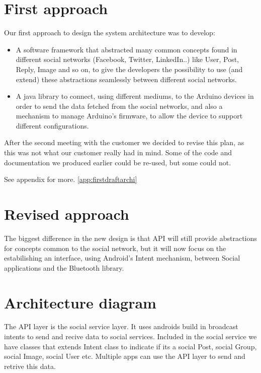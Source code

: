 \section{First approach}

Our first approach to design the system architecture was to develop:

\begin{itemize}
\item A software framework that
abstracted many common concepts found in different social networks (Facebook, Twitter, LinkedIn..)
like User, Post, Reply, Image and so on, to give the developers the possibility to use
(and extend) these abstractions seamlessly between different social networks.
\end{itemize}

\begin{itemize}
\item A java library to connect, using different mediums, to the Arduino devices in order
to send the data fetched from the social networks, and also a mechanism to manage Arduino's firmware,
to allow the device to support different configurations.
\end{itemize}

After the second meeting with the customer we decided to revise this plan, as this was not what
our customer really had in mind. Some of the code and documentation we produced earlier could be re-used, but some could not.

See appendix for more. \ref{app:firstdraftarchi}

\section{Revised approach}
The biggest difference in the new design is that API will still provide abstractions
for concepts common to the social network, but it will now focus on the estabilishing an interface,
using Android's Intent mechanism, between Social applications and the Bluetooth library.

\newpage
\section{Architecture diagram}
The API layer is the social service layer. It uses androids build in broadcast intents to send and recive data to social services. Included in the social service we have classes that extends Intent class to indicate if its a social Post, social Group, social Image, social User etc. Multiple apps can use the API layer to send and retrive this data. 

